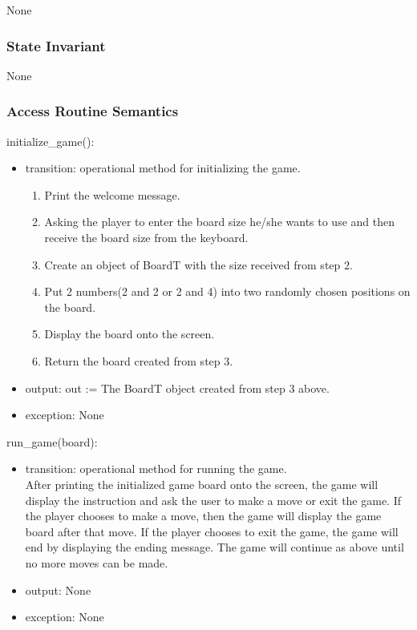 \documentclass[12pt]{article}
\begin{document}
None
\subsubsection* {State Invariant}

None

\subsubsection* {Access Routine Semantics}

initialize\_game():
\begin{itemize}
  \item transition: operational method for initializing the game.
  \begin{enumerate}
  \item Print the welcome message.
  \item Asking the player to enter the board size he/she wants to use and then receive the board size from the keyboard.
  \item Create an object of BoardT with the size received 
  from step 2.
  \item Put 2 numbers(2 and 2 or 2 and 4) into two randomly chosen 
  positions on the board.
  \item Display the board onto the screen.
  \item Return the board created from step 3.
  \end{enumerate}
  \item output: out := The BoardT object created from step 3 above.
  \item exception: None
\end{itemize}

\noindent run\_game(board):
\begin{itemize}
  \item transition: operational method for running the game.\\ After
  printing the initialized game board onto the screen, the game will
  display the instruction and ask the user to make a move or exit the
  game. If the player chooses to make a move, then the game will
  display the game board after that move. If the player chooses to
  exit the game, the game will end by displaying the ending message.
  The game will continue as above until no more moves can be made.
  \item output: None
  \item exception: None
\end{itemize}
\end{document}
